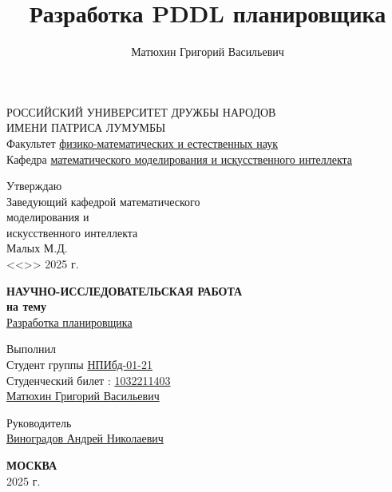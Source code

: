 \documentclass{article}
\title{Разработка PDDL планировщика}
\author{Матюхин Григорий Васильевич}
\begin{document}
\begin{titlepage}

  \begin{center}
  \hfill \break
  \large{РОССИЙСКИЙ УНИВЕРСИТЕТ ДРУЖБЫ НАРОДОВ}\\
  \large{ИМЕНИ ПАТРИСА ЛУМУМБЫ}\\
  \normalsize{Факультет \underline{физико-математических и естественных наук}}\\ 
  \normalsize{Кафедра \underline{математического моделирования и искусственного интеллекта}}\\

  \vspace*{\fill}

  \begin{flushright}
    \large{Утверждаю}\\
    \normalsize{Заведующий кафедрой} 
    \normalsize{математического \\ моделирования и \\ искусственного интеллекта \\} 
    \underline{\phantom{signature signature}} Малых М.Д. \\
    <<\underline{\phantom{day}}>> \underline{\phantom{month month}} 2025 г.
    \end{flushright}
 
  \vspace*{\fill}
  \Large{\textbf{НАУЧНО-ИССЛЕДОВАТЕЛЬСКАЯ РАБОТА\\ на тему}}
  \\
  \underline{Разработка планировщика}
  \vspace*{\fill}
  
  \end{center}
   
   \begin{flushright}
    Выполнил \\
    Студент группы \underline{НПИбд-01-21}\\
    Студенческий билет \textnumero{}: \underline{1032211403} \\
    \underline{Матюхин Григорий Васильевич \phantom{signature}}\\ \vspace{0.5cm}
   \end{flushright}

   \vspace*{\fill}

   \begin{flushright}
    Руководитель \\
    \underline{Виноградов Андрей Николаевич \phantom{signature}}\\ \vspace{0.5cm}
   \end{flushright}
   
  \begin{center} \textbf{МОСКВА} \\ 2025 г. \end{center}
  \thispagestyle{empty} %
   
\end{titlepage}
    
\end{document}
